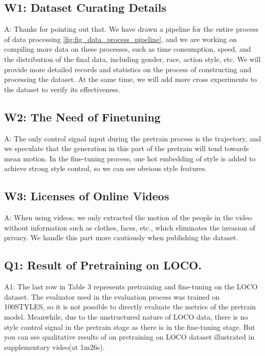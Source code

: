\documentclass{article}
\begin{document}
\subsection{W1: Dataset Curating Details}\label{w1-dataset-curating-details}
A: Thanks for pointing out that. We have drawn a pipeline for the entire process of data processing \ref{fig:fig_data_process_pipeline}, and we are working on compiling more data on these processes, such as time consumption, speed, and the distribution of the final data, including gender, race, action style, etc. We will provide more detailed records and statistics on the process of constructing and processing the dataset. At the same time, we will add more cross experiments to the dataset to verify its effectiveness. 

\subsection{W2: The Need of Finetuning}\label{w2-the-need-of-finetuning}

A: The only control signal input during the pretrain process is the trajectory, and we speculate that the generation in this part of the pretrain will tend towards mean motion. In the fine-tuning process, one hot embedding of style is added to achieve strong style control, so we can see obvious style features.

\subsection{W3: Licenses of Online Videos}\label{w3-licenses-of-online-videos}

A: When using videos, we only extracted the motion of the people in the video without information such as clothes, faces, etc., which eliminates the invasion of privacy. We handle this part more cautiously when publishing the dataset.

\subsection{Q1: Result of Pretraining on LOCO.}\label{q1-result-of-pretraining-on-loco.}

A1: The last row in Table 3 represents pretraining and fine-tuning on the LOCO dataset. The evaluator used in the evaluation process was trained on 100STYLES, so it is not possible to directly evaluate the metrics of the pretrain model. Meanwhile, due to the unstructured nature of LOCO data, there is no style control signal in the pretrain stage as there is in the fine-tuning stage. But you can see qualitative results of on pretraining on LOCO dataset illustrated in supplementary video(at 1m26s).
\end{document}
